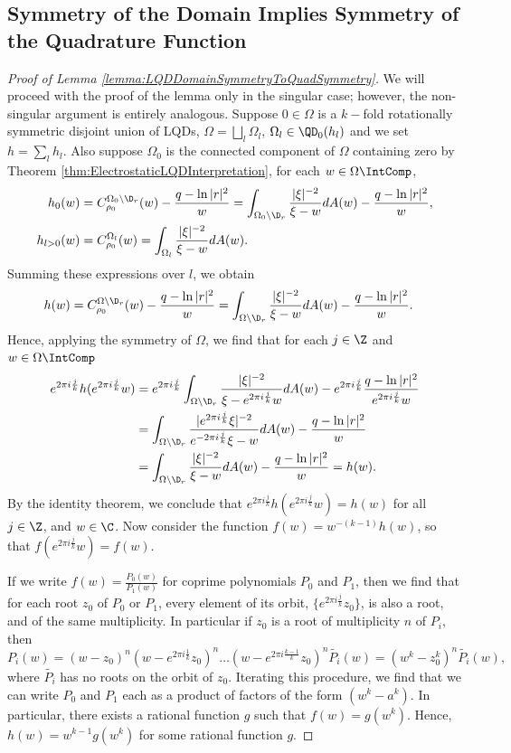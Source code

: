 \documentclass{article}
\numberwithin{equation}{section}
\begin{document}
\subsection{Symmetry of the Domain Implies Symmetry of the Quadrature Function}
\begin{proof}[Proof of Lemma \ref{lemma:LQDDomainSymmetryToQuadSymmetry}]\label{proof:LQDDomainSymmetryToQuadSymmetry}
We will proceed with the proof of the lemma only in the singular case; however, the non-singular argument is entirely analogous.
Suppose $0\in\Omega$ is a $k-$fold rotationally symmetric disjoint union of LQDs, $\Omega=\bigsqcup_{l}\Omega_l$, $\Omega_l\in\QD_0(h_l)$ and we set $h=\sum_lh_l$. Also suppose $\Omega_0$ is the connected component of $\Omega$ containing zero by Theorem \ref{thm:ElectrostaticLQDInterpretation}, for each $w\in\Omega\IntComp$,
\begin{align*}
    h_0(w)&=C_{\rho_0}^{\Omega_0\setminus\D_r}(w)-\dfrac{q-\ln|r|^2}{w}=\int_{\Omega_0\setminus\D_r}\dfrac{|\xi|^{-2}}{\xi-w}dA(w)-\dfrac{q-\ln|r|^2}{w},\\
    h_{l>0}(w)&=C_{\rho_0}^{\Omega_l}(w)=\int_{\Omega_l}\dfrac{|\xi|^{-2}}{\xi-w}dA(w).
\end{align*}
Summing these expressions over $l$, we obtain
\begin{align*}
    h(w)&=C_{\rho_0}^{\Omega\setminus\D_r}(w)-\dfrac{q-\ln|r|^2}{w}=\int_{\Omega\setminus\D_r}\dfrac{|\xi|^{-2}}{\xi-w}dA(w)-\dfrac{q-\ln|r|^2}{w}.
\end{align*}
Hence, applying the symmetry of $\Omega$, we find that for each $j\in\Z$ and $w\in\Omega\IntComp$
\begin{align*}
    e^{2\pi i\frac{j}{k}}h(e^{2\pi i\frac{j}{k}}w)&=e^{2\pi i\frac{j}{k}}\int_{\Omega\setminus\D_r}\dfrac{|\xi|^{-2}}{\xi-e^{2\pi i\frac{j}{k}}w}dA(w)-e^{2\pi i\frac{j}{k}}\dfrac{q-\ln|r|^2}{e^{2\pi i\frac{j}{k}}w}\\
    &=\int_{\Omega\setminus\D_r}\dfrac{|e^{2\pi i\frac{j}{k}}\xi|^{-2}}{e^{-2\pi i\frac{j}{k}}\xi-w}dA(w)-\dfrac{q-\ln|r|^2}{w}\\
    &=\int_{\Omega\setminus\D_r}\dfrac{|\xi|^{-2}}{\xi-w}dA(w)-\dfrac{q-\ln|r|^2}{w}=h(w).
\end{align*}
By the identity theorem, we conclude that $e^{2\pi i\frac{j}{k}}h(e^{2\pi i\frac{j}{k}}w)=h(w)$ for all $j\in\Z$, and $w\in\C$. Now consider the function $f(w)=w^{-(k-1)}h(w)$, so that $f(e^{2\pi i\frac{j}{k}}w)=f(w)$.

If we write $f(w)=\frac{P_0(w)}{P_1(w)}$ for coprime polynomials $P_0$ and $P_1$, then we find that for each root $z_0$ of $P_0$ or $P_1$, every element of its orbit, $\{e^{2\pi i\frac{j}{k}}z_0\}$, is also a root, and of the same multiplicity. In particular if $z_0$ is a root of multiplicity $n$ of $P_i$, then
$$P_{i}(w)=(w-z_0)^n(w-e^{2\pi i\frac{1}{k}}z_0)^n\hdots(w-e^{2\pi i\frac{k-1}{k}}z_0)^n\widetilde{P_i}(w)=(w^k-z_0^k)^n\widetilde{P_i}(w),$$
where $\widetilde{P_i}$ has no roots on the orbit of $z_0$. Iterating this procedure, we find that we can write $P_0$ and $P_1$ each as a product of factors of the form $(w^k-a^k)$. In particular, there exists a rational function $g$ such that $f(w)=g(w^k)$. Hence, $h(w)=w^{k-1}g(w^k)$ for some rational function $g$.
\end{proof}
\end{document}

